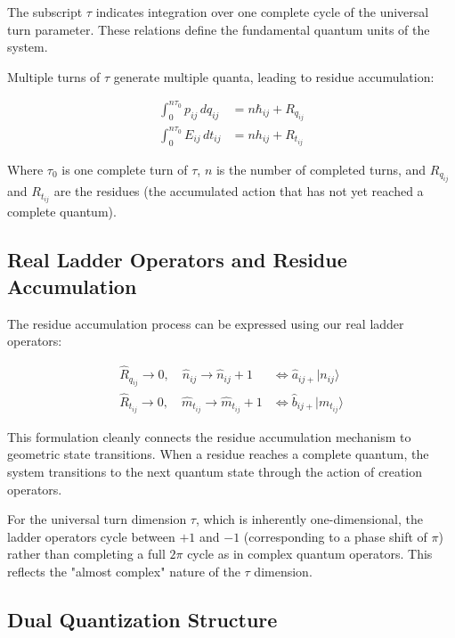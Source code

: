 \documentclass{article}
\begin{document}
The subscript $\tau$ indicates integration over one complete cycle of the universal turn parameter. These relations define the fundamental quantum units of the system.

Multiple turns of $\tau$ generate multiple quanta, leading to residue accumulation:

\begin{align}
\int_{0}^{n\tau_0} p_{ij} \, dq_{ij} &= n \hbar_{ij} + R_{q_{ij}} \\
\int_{0}^{n\tau_0} E_{ij} \, dt_{ij} &= n h_{ij} + R_{t_{ij}}
\end{align}

Where $\tau_0$ is one complete turn of $\tau$, $n$ is the number of completed turns, and $R_{q_{ij}}$ and $R_{t_{ij}}$ are the residues (the accumulated action that has not yet reached a complete quantum).

\subsection{Real Ladder Operators and Residue Accumulation}

The residue accumulation process can be expressed using our real ladder operators:

\begin{align}
\hat{R}_{q_{ij}} \rightarrow 0, \quad \hat{n}_{ij} \rightarrow \hat{n}_{ij} + 1 &\Leftrightarrow \hat{a}_{ij+} |n_{ij}\rangle \\
\hat{R}_{t_{ij}} \rightarrow 0, \quad \hat{m}_{t_{ij}} \rightarrow \hat{m}_{t_{ij}} + 1 &\Leftrightarrow \hat{b}_{ij+} |m_{t_{ij}}\rangle
\end{align}

This formulation cleanly connects the residue accumulation mechanism to geometric state transitions. When a residue reaches a complete quantum, the system transitions to the next quantum state through the action of creation operators.

For the universal turn dimension $\tau$, which is inherently one-dimensional, the ladder operators cycle between $+1$ and $-1$ (corresponding to a phase shift of $\pi$) rather than completing a full $2\pi$ cycle as in complex quantum operators. This reflects the "almost complex" nature of the $\tau$ dimension.

\subsection{Dual Quantization Structure}
\end{document}
